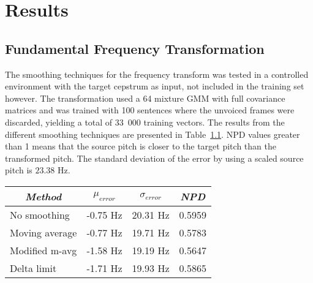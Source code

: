 \chapter{Results} %
\label{cha:results}

% 
% 
% 
% 
% 


\section{Fundamental Frequency Transformation} %
\label{sec:fundamental_frequency_ransformation}
The smoothing techniques for the frequency transform was tested in a controlled environment with the target cepstrum as input, not included in the training set however. The transformation used a 64 mixture GMM with full covariance matrices and was trained with 100 sentences where the unvoiced frames were discarded, yielding a total of 33~000 training vectors. The results from the different smoothing techniques are presented in Table~\ref{tab:pitch_pred_target_input}. NPD values greater than 1 means that the source pitch is closer to the target pitch than the transformed pitch. The standard deviation of the error by using a scaled source pitch is $23.38$ Hz.
\begin{table}[htbp]
	\begin{center}
		\label{tab:pitch_pred_target_input}	
		\begin{tabular}{lrrr}
			\toprule
			\multicolumn{1}{c}{\emph{Method}} & \multicolumn{1}{c}{$\mu_{error}$} & \multicolumn{1}{c}{$\sigma_{error}$} & \multicolumn{1}{c}{\emph{NPD}} \\
			\midrule
			No smoothing & -0.75 Hz & 20.31 Hz & 0.5959\\
			Moving average & -0.77 Hz & 19.71 Hz & 0.5783 \\
			Modified m-avg & -1.58 Hz & 19.19 Hz & 0.5647 \\
			Delta limit & -1.71 Hz & 19.93 Hz & 0.5865 \\
			\bottomrule			
		\end{tabular}		
	\end{center}
\end{table}

